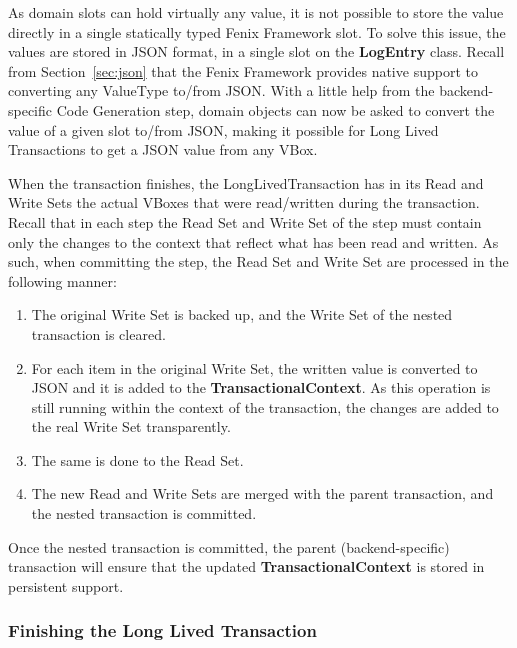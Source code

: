 As domain slots can hold virtually any value, it is not possible to
store the value directly in a single statically typed Fenix Framework
slot. To solve this issue, the values are stored in JSON format, in a
single slot on the {\bf LogEntry} class. Recall from
Section~\ref{sec:json} that the Fenix Framework provides native
support to converting any ValueType to/from JSON. With a little help
from the backend-specific Code Generation step, domain objects can now
be asked to convert the value of a given slot to/from JSON, making it
possible for Long Lived Transactions to get a JSON value from any
VBox.

When the transaction finishes, the LongLivedTransaction has in its
Read and Write Sets the actual VBoxes that were read/written during
the transaction. Recall that in each step the Read Set and Write Set
of the step must contain only the changes to the context that reflect
what has been read and written. As such, when committing the step, the
Read Set and Write Set are processed in the following manner:

\begin{enumerate}

\item The original Write Set is backed up, and the Write Set of the
  nested transaction is cleared.

\item For each item in the original Write Set, the written value is
  converted to JSON and it is added to the {\bf
    TransactionalContext}. As this operation is still running within
  the context of the transaction, the changes are added to the real
  Write Set transparently.

\item The same is done to the Read Set.

\item The new Read and Write Sets are merged with the parent
  transaction, and the nested transaction is committed.

\end{enumerate}

Once the nested transaction is committed, the parent
(backend-specific) transaction will ensure that the updated {\bf
  TransactionalContext} is stored in persistent support.

\subsubsection{Finishing the Long Lived Transaction}

